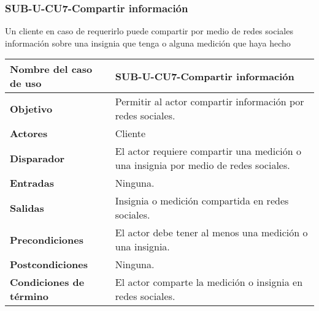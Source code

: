 \subsubsection{SUB-U-CU7-Compartir información}\label{SUB-U-CU7}
Un cliente en caso de requerirlo puede compartir por medio de redes sociales información sobre una insignia que tenga o alguna medición que haya hecho

\begin{longtable}{|J{5cm}|J{10.3cm}|}
	\hline
	\textbf{Nombre del caso de uso} &
		SUB-U-CU7-Compartir información \\ \hline
	\textbf{Objetivo} &
		Permitir al actor compartir información por redes sociales. \\ \hline
	\textbf{Actores} &
		Cliente \\ \hline 
	\textbf{Disparador} & 
		El actor requiere compartir una medición o una insignia por medio de redes sociales. \\ \hline 
	\textbf{Entradas} & Ninguna.
		\\ \hline 
	\textbf{Salidas} & Insignia o medición compartida en redes sociales.
		\\ \hline
	\textbf{Precondiciones} &
		El actor debe tener al menos una medición o una insignia.\\ \hline
	\textbf{Postcondiciones} & Ninguna.
		 \\ \hline
	\textbf{Condiciones de término} & El actor comparte la medición o insignia en redes sociales.

\end{longtable}
